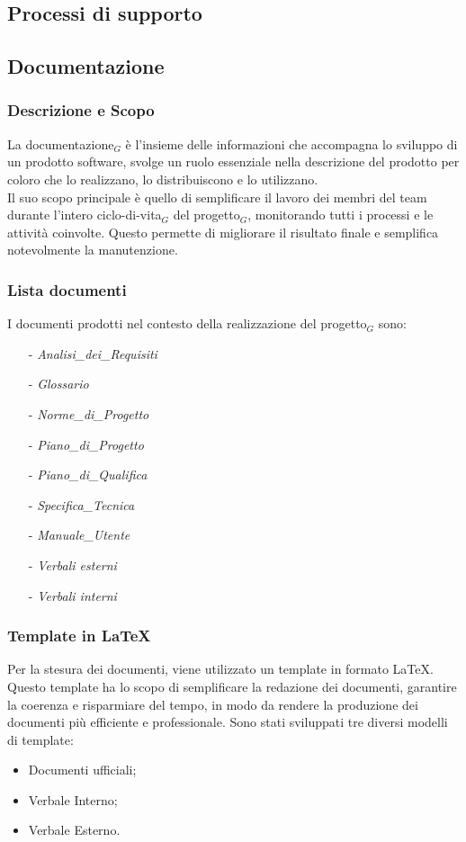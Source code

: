 \documentclass[10pt]{article}
\begin{document}
\begin{justify}
\newpage
\section{Processi di supporto}
    \subsection{Documentazione}

    \subsubsection{Descrizione e Scopo}
    La documentazione$_G$ è l'insieme delle informazioni che accompagna lo sviluppo di un prodotto software, svolge un ruolo essenziale nella descrizione del prodotto per coloro che lo realizzano, lo distribuiscono e lo utilizzano.\\
    Il suo scopo principale è quello di semplificare il lavoro dei membri del team durante l'intero ciclo-di-vita$_G$ del progetto$_G$, monitorando tutti i processi e le attività coinvolte. Questo permette di migliorare il risultato finale e semplifica notevolmente la manutenzione.

    \subsubsection{Lista documenti}
    I documenti prodotti nel contesto della realizzazione del progetto$_G$ sono:
    \begin{itemize}
        \item [-] \textit{Analisi\_dei\_Requisiti}
        \item [-] \textit{Glossario}
        \item [-] \textit{Norme\_di\_Progetto}
        \item [-] \textit{Piano\_di\_Progetto}
        \item [-] \textit{Piano\_di\_Qualifica}
        \item [-] \textit{Specifica\_Tecnica}
        \item [-] \textit{Manuale\_Utente}
        \item [-] \textit{Verbali esterni}
        \item [-] \textit{Verbali interni}
    \end{itemize}

    \subsubsection{Template in \LaTeX}
    Per la stesura dei documenti, viene utilizzato un template in formato \LaTeX. Questo template ha lo scopo di semplificare la redazione dei documenti, garantire la coerenza e risparmiare del tempo, in modo da rendere la produzione dei documenti più efficiente e professionale. Sono stati sviluppati tre diversi modelli di template:
    \begin{itemize}
        \item Documenti ufficiali;
        \item Verbale Interno;
        \item Verbale Esterno.
    \end{itemize}


\end{justify}
\end{document}

